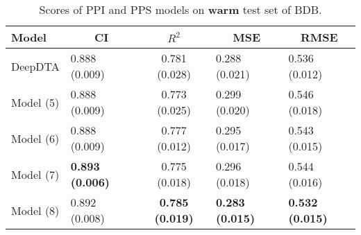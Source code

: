 \begin{table}[H]
\centering
\caption{Scores of PPI and PPS models on \textbf{warm} test set of BDB.}
\label{tab:ddi_ci_r2}
\begin{tabular}{|l|l|c|l|l|} 
\hline
Model & \multicolumn{1}{c|}{CI} & $R^2$ & \multicolumn{1}{c|}{MSE} & \multicolumn{1}{c|}{RMSE} \\ 
\hline
DeepDTA & 0.888 (0.009) & 0.781 (0.028) & 0.288 (0.021) & 0.536 (0.012) \\ 
\hline
Model (5) & 0.888 (0.009) & 0.773 (0.025) & 0.299 (0.020) & 0.546 (0.018) \\ 
\hline
Model (6) & 0.888 (0.009) & 0.777 (0.012) & 0.295 (0.017) & 0.543 (0.015) \\ 
\hline
Model (7) & \textbf{0.893 (0.006)} & 0.775 (0.018) & 0.296 (0.018) & 0.544 (0.016) \\ 
\hline
Model (8) & 0.892 (0.008) & \textbf{0.785 (0.019)} & \textbf{0.283 (0.015)} & \textbf{0.532 (0.015)} \\
\hline
\end{tabular}
\label{tab:ppi_vs_pps_warm}
\end{table}